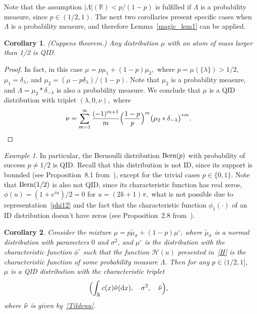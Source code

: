 \documentclass[a4paper,11pt]{article}
\newtheorem{cor}{Corollary}
\theoremstyle{definition}
\newcommand{\Be}{{\rm{Bern}}}
\newcommand{\1}{\mathbb{I}}
\theoremstyle{remark}
\newtheorem{ex}{Example}
\begin{document}

Note that the assumption $|\Lambda|(\mathbb{R}) < p/(1-p)$ is fulfilled if \(\Lambda\) is a probability measure, since \(p \in (1/2,1)\). The next two corollaries present specific cases when \(\Lambda\) is a probability measure, and therefore Lemma~\ref{magic_lem1} can be applied.\begin{cor}
(Cuppens theorem.) Any distribution \(\mu\) with an atom of mass larger than 1/2 is QID. 
\end{cor}
\begin{proof}
In fact, in this case \(\mu = p \mu_1 + (1-p) \mu_2,\) where \(p=\mu(\{\lambda\})>1/2\), \(\mu_1 = \delta_\lambda\), and 
\(\mu_2 = (\mu - p \delta_\lambda)/(1-p).\) Note that \(\mu_2\) is a probability measure, and \(\Lambda=\mu_2 * \delta_{-\lambda}\)   is also a probability measure. We conclude that   \(\mu\)  is a QID distribution with triplet \((\lambda,0, \nu),\)  where 
\begin{eqnarray*}
\nu = \sum_{m=1}^\infty \frac{(-1)^{m+1}}{m}
\Bigl( 
\frac{1-p}{p} 
\Bigr)^m \bigl(  \mu_2 * \delta_{-\lambda} \bigr)^{*m}.
\end{eqnarray*}
\end{proof}
\begin{ex}\label{ex1}
In particular, the Bernoulli distribution \(\Be(p)\) with probability of success \(p \ne 1/2\) is QID. Recall that this distribution is not ID, since its support is bounded (see Proposition~8.1 from~\cite{SvH2004}), except for the trivial cases  $p \in \{0, 1\}$.  Note that \(\Be(1/2)\)  is also not QID, since its characteristic function has real zeros, 
\(\phi(u) = (1+  e^{i u})/2 = 0 \) 
 for \(u = (2k+1) \pi,\) what is not possible due to representation~\eqref{phi12} and the fact that the characteristic function \(\phi_1(\cdot)\)  of an ID distribution doesn't have zeros (see Proposition~2.8 from~\cite{SvH2004}).
 \end{ex}
\begin{cor} \label{cor2}
Consider the mixture $\mu = p\tilde\mu_\sigma + (1-p) \mu^\circ$, where  \(\tilde\mu_\sigma\) is a normal distribution  with parameters \(0\) and \(\sigma^2\), and \(\mu^\circ\) is the distribution with the characteristic function \(\phi^\circ\) such that the function \(\mathcal{H}(u)\) presented in~\eqref{H}
is the characteristic function of some probability measure \(\Lambda\). Then  for any \(p \in (1/2,1]\), \(\mu\) is a QID distribution  with the characteristic triplet \[\Bigl( \int_{\mathbb{R}}c(x)\Tilde{\nu}(\mathrm{d}x),  \quad  \sigma^2, \quad \Tilde{\nu}\Bigr),\]
where  $\Tilde{\nu}$ is given by~\eqref{Tildenu}.
\end{cor}
\end{document}
